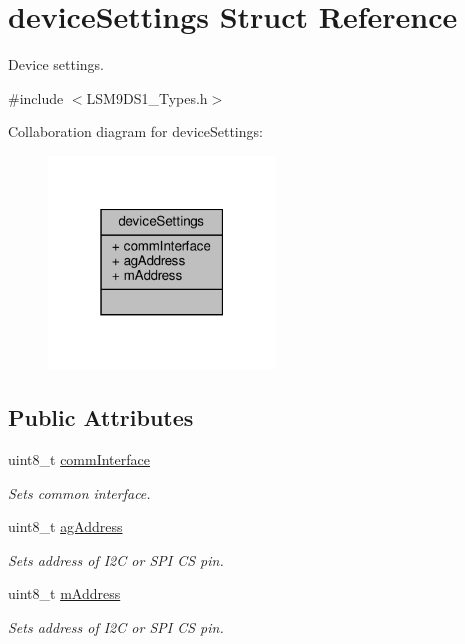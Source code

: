 \hypertarget{structdeviceSettings}{}\section{device\+Settings Struct Reference}
\label{structdeviceSettings}


Device settings.  




{\ttfamily \#include $<$L\+S\+M9\+D\+S1\+\_\+\+Types.\+h$>$}



Collaboration diagram for device\+Settings\+:\nopagebreak
\begin{figure}[H]
\begin{center}
\leavevmode
\includegraphics[width=171pt]{structdeviceSettings__coll__graph}
\end{center}
\end{figure}
\subsection*{Public Attributes}
\begin{DoxyCompactItemize}
\item 
\mbox{\label{structdeviceSettings_a6512c63d06cce5f99760b1b3a6a4dfe9}} 
uint8\+\_\+t \hyperlink{structdeviceSettings_a6512c63d06cce5f99760b1b3a6a4dfe9}{comm\+Interface}
\begin{DoxyCompactList}\small\item\em Sets common interface. \end{DoxyCompactList}\item 
\mbox{\label{structdeviceSettings_a2f43ac785e01fcbcfaf8436885f638ab}} 
uint8\+\_\+t \hyperlink{structdeviceSettings_a2f43ac785e01fcbcfaf8436885f638ab}{ag\+Address}
\begin{DoxyCompactList}\small\item\em Sets address of I2C or S\+PI CS pin. \end{DoxyCompactList}\item 
\mbox{\label{structdeviceSettings_aec4e1d3e3f38b4e3e0f74f1640e16faa}} 
uint8\+\_\+t \hyperlink{structdeviceSettings_aec4e1d3e3f38b4e3e0f74f1640e16faa}{m\+Address}
\begin{DoxyCompactList}\small\item\em Sets address of I2C or S\+PI CS pin. \end{DoxyCompactList}\end{DoxyCompactItemize}


